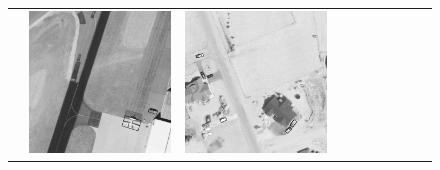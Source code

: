 \begin{figure}[h!]
\begin{tabularx}{\textwidth}{c|*{9}{X}}
    &  \includegraphics[trim={650pt 120pt 170pt 720pt},clip,width=\linewidth]{images/015Results/03ablation/comp_images/ground_truth/487.png}
    & \includegraphics[trim={230pt 200pt 680pt 725pt},clip,width=\linewidth]{images/015Results/03ablation/comp_images/ground_truth/509.png}

\end{tabularx}
\end{figure}
